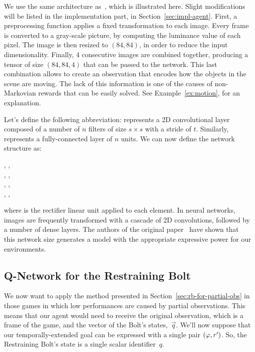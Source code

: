 We use the same architecture as~\cite{bib:atari-deepq-nature}, which is
illustrated here. Slight modifications will be listed in the implementation
part, in Section~\ref{sec:impl-agent}. First, a preprocessing function applies
a fixed transformation to each image. Every frame is converted to a gray-scale
picture, by computing the luminance value of each pixel. The image is then
resized to $(84, 84)$, in order to reduce the input dimensionality. Finally, 4
consecutive images are combined together, producing a tensor of size $(84, 84,
4)$ that can be passed to the network. This last combination allows to create
an observation that encodes how the objects in the scene are moving. The lack
of this information is one of the causes of non-Markovian rewards that can be
easily solved. See Example~\ref{ex:motion}, for an explanation.

Let's define the following abbreviation:  represents
a 2D convolutional layer composed of a number of $n$ filters of size $s \times
s$ with a stride of $t$. Similarly,  represents a
fully-connected layer of $n$ units. We can now define the network structure
as:
\begin{center}
	, \relu{}, \\
	, \relu{}, \\
	, \relu{}, \\
	, \relu{}, \\
\end{center}
where \relu{} is the rectifier linear unit applied to each element. In neural
networks, images are frequently transformed with a cascade of 2D convolutions,
followed by a number of dense layers. The authors of the original
paper~\cite{bib:atari-deepq-nature} have shown that this network size
generates a model with the appropriate expressive power for our environments.


\subsection{Q-Network for the Restraining Bolt}

\label{sec:model-atari-rb}

We now want to apply the method presented in
Section~\ref{sec:rb-for-partial-obs} in those games in which low performances
are caused by partial observations. This means that our agent would need to
receive the original observation, which is a frame of the game, and the
vector of the Bolt's states,~$\vec{q}$. We'll now suppose that our
temporally-extended goal can be expressed with a single pair ${(\varphi,
r')}$. So, the Restraining Bolt's state is a single scalar identifier~$q$.

